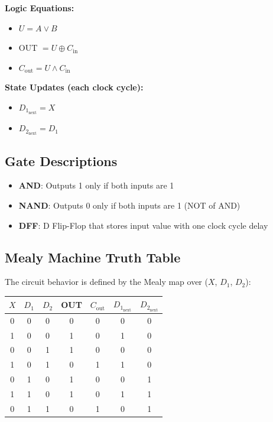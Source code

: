 \textbf{Logic Equations:}
\begin{itemize}
  \item $U = A \lor B$
  \item OUT $= U \oplus C_{\text{in}}$
  \item $C_{\text{out}} = U \land C_{\text{in}}$
\end{itemize}

\textbf{State Updates (each clock cycle):}
\begin{itemize}
  \item $D_{1_{\text{next}}} = X$
  \item $D_{2_{\text{next}}} = D_1$
\end{itemize}

\subsection*{Gate Descriptions}
\begin{itemize}
  \item \textbf{AND}: Outputs 1 only if both inputs are 1
  \item \textbf{NAND}: Outputs 0 only if both inputs are 1 (NOT of AND)
  \item \textbf{DFF}: D Flip-Flop that stores input value with one clock cycle delay
\end{itemize}

\subsection*{Mealy Machine Truth Table}
The circuit behavior is defined by the Mealy map over ($X$, $D_1$, $D_2$):
\begin{center}
\begin{tabular}{|c|c|c|c|c|c|c|}
\hline
$X$ & $D_1$ & $D_2$ & OUT & $C_{\text{out}}$ & $D_{1_{\text{next}}}$ & $D_{2_{\text{next}}}$ \\
\hline
0 & 0 & 0 & 0 & 0 & 0 & 0 \\
1 & 0 & 0 & 1 & 0 & 1 & 0 \\
0 & 0 & 1 & 1 & 0 & 0 & 0 \\
1 & 0 & 1 & 0 & 1 & 1 & 0 \\
0 & 1 & 0 & 1 & 0 & 0 & 1 \\
1 & 1 & 0 & 1 & 0 & 1 & 1 \\
0 & 1 & 1 & 0 & 1 & 0 & 1 \\
\hline
\end{tabular}
\end{center}

